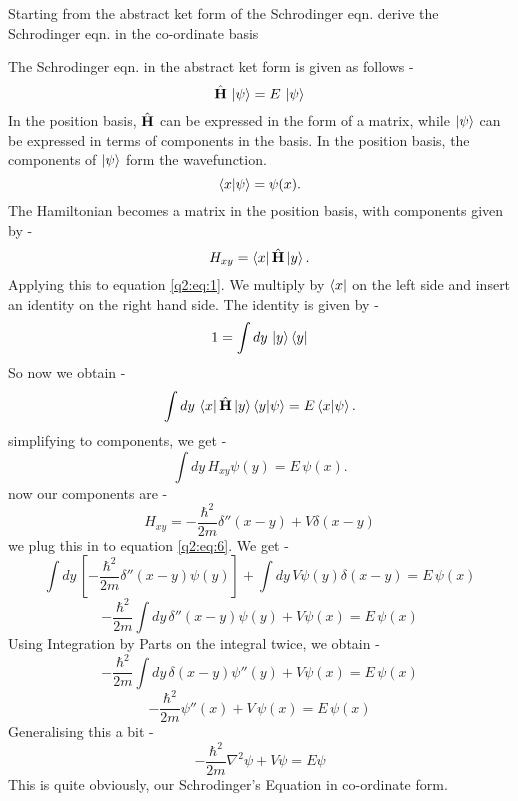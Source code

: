 Starting from the abstract ket form of the Schrodinger eqn. derive the Schrodinger eqn. in the co-ordinate basis

The Schrodinger eqn. in the abstract ket form is given as follows -
    \begin{equation} \label{q2:eq:1}
        \hat{\textbf{H}} \, \ket{\psi} = E\, \ket{\psi}
    \end{equation}
In the position basis, $\hat{\textbf{H}}$ can be expressed in the form of a matrix, while $\ket{\psi}$ can be expressed in terms of components in the basis.
In the position basis, the components of $\ket{\psi}$ form the wavefunction.
    \begin{equation}
        \braket{x}{\psi} = \psi(x).
    \end{equation}
The Hamiltonian becomes a matrix in the position basis, with components given by -
    \begin{equation}
        H_{xy} = \bra{x}\hat{\textbf{H}}\ket{y}.
    \end{equation}
Applying this to equation \ref{q2:eq:1}. We multiply by $\bra{x}$ on the left side and insert an identity on the right hand side.
The identity is given by - 
    \begin{equation}
        1 = \int dy\, \ket{y}\bra{y}
    \end{equation}
So now we obtain - 
    \begin{equation}
        \int dy\, \bra{x}\hat{\textbf{H}}\ket{y}\braket{y}{\psi} = E \braket{x}{\psi}.
    \end{equation}
simplifying to components, we get -
    \begin{equation} \label{q2:eq:6}
        \int dy \, H_{xy} \psi(y) = E \, \psi(x).
    \end{equation}
now our components are - 
    \begin{equation}
        H_{xy} = -\frac{\hbar^2}{2m}\delta''(x-y) + V\delta(x-y)
    \end{equation}
we plug this in to equation \ref{q2:eq:6}. We get - 
    \begin{equation}
        \int dy \, [-\frac{\hbar^2}{2m}\delta''(x-y) \psi(y)] + \int dy \, V\psi(y)\delta(x-y) = E \, \psi(x)
    \end{equation}
    \begin{equation}
        - \frac{\hbar^2}{2m} \int dy \, \delta''(x-y) \psi(y) + V \psi(x) = E\,  \psi(x)        
    \end{equation}
Using Integration by Parts on the integral twice, we obtain - 
    \begin{equation}
        - \frac{\hbar^2}{2m} \int dy \, \delta(x-y) \psi''(y) + V \psi(x) = E\,  \psi(x)        
    \end{equation}
    \begin{equation}
        - \frac{\hbar^2}{2m} \psi''(x) + V\, \psi(x) = E\,  \psi(x)        
    \end{equation}
Generalising this a bit - 
    \begin{equation}
        - \frac{\hbar^2}{2m} \nabla^2 \psi + V \psi = E \psi        
    \end{equation}
This is quite obviously, our Schrodinger's Equation in co-ordinate form.
